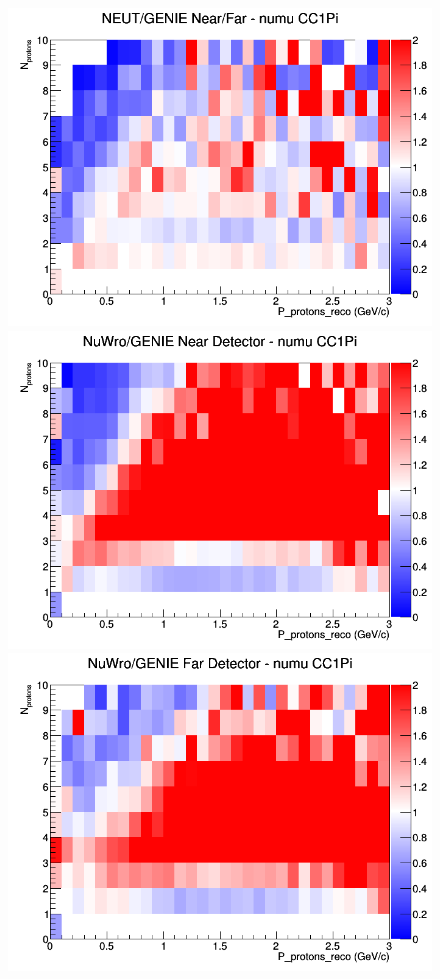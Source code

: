 \begin{figure}[h]
\endminipage
{}
\includegraphics[width=\linewidth]{eff_N_P/GAr/protons/ratios/CC1Pi_NEUT_GENIE_numu_NF_N_P.png}
\endminipage
\newline
{}
\includegraphics[width=\linewidth]{eff_N_P/GAr/protons/ratios/CC1Pi_NuWro_GENIE_numu_near_N_P.png}
\endminipage
{}
\includegraphics[width=\linewidth]{eff_N_P/GAr/protons/ratios/CC1Pi_NuWro_GENIE_numu_far_N_P.png}

\end{figure}

